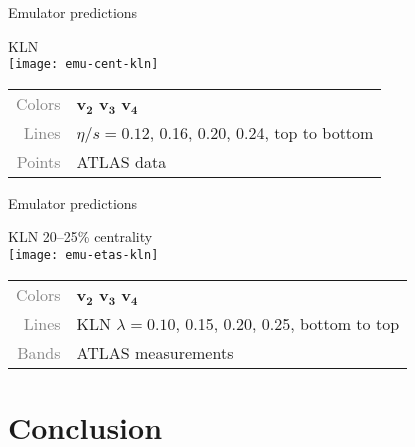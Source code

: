 \documentclass{beamer}
\begin{document}
\begin{frame}{Emulator predictions}
  \begin{center}
    \hspace{1ex} KLN \\[1ex]
    \texttt{[image: emu-cent-kln]} \\
  \end{center}

  \small
  \begin{tabular}{rl}
    \textcolor{grey}{Colors} &
    \textcolor{vnbl}{$\boldsymbol{v_2}$}
    \textcolor{vngr}{$\boldsymbol{v_3}$}
    \textcolor{vnor}{$\boldsymbol{v_4}$} \\
    \textcolor{grey}{Lines} & $\eta/s = 0.12$, 0.16, 0.20, 0.24, top to bottom \\
    \textcolor{grey}{Points} & ATLAS data
  \end{tabular}
\end{frame}



\begin{frame}{Emulator predictions}
  \begin{center}
    \hspace{1ex} KLN 20--25\% centrality \\[1ex]
    \texttt{[image: emu-etas-kln]} \\
  \end{center}

  \small
  \begin{tabular}{rl}
    \textcolor{grey}{Colors} &
    \textcolor{vnbl}{$\boldsymbol{v_2}$}
    \textcolor{vngr}{$\boldsymbol{v_3}$}
    \textcolor{vnor}{$\boldsymbol{v_4}$} \\
    \textcolor{grey}{Lines} & KLN $\lambda = 0.10$, 0.15, 0.20, 0.25, bottom to top \\
    \textcolor{grey}{Bands} & ATLAS measurements
  \end{tabular}
\end{frame}



\section{Conclusion}
\end{document}
